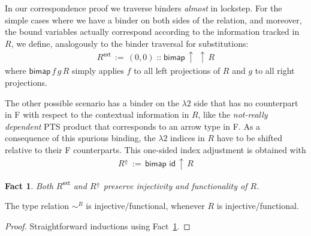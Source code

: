 \documentclass[a4paper,UKenglish]{lipics-v2016}
\newcommand{\ms}{\,}
\newcommand{\mrel}[1]{\mathrel{\ms #1 \ms}}
\newcommand{\eqdef}{\mrel{:=}}
\newcommand{\SysL}{$\lambda2$\xspace}
\newcommand{\tyr}{\mathrel{\sim}}
\newcommand{\Rext}[1]{\ensuremath{#1^{\mathsf{ext}}}}
\newcommand{\Rshift}[1]{\ensuremath{#1^{\Uparrow}}}
\newcommand{\id}{\mathsf{id}}
\newcommand{\shift}{\ensuremath{\uparrow}}
\theoremstyle{plain}
\newtheorem{fact}[theorem]{Fact}
\begin{document}
In our correspondence proof we traverse binders \emph{almost} in lockstep.
For the simple cases where we have a binder on both sides of the relation, and moreover, the bound variables actually correspond according to the information tracked in $R$, we define, analogously to the binder traversal for substitutions:
\begin{align*}
  \Rext{R} \eqdef (0,0) \mathop{::} \mathsf{bimap}\,\shift\,\,\shift\,R
\end{align*}
where $\mathsf{bimap}\,f\,g\,R$ simply applies $f$ to all left projections of $R$ and $g$ to all right projections.

The other possible scenario has a binder on the \SysL side that has no counterpart in F with respect to the contextual information in $R$, like the \emph{not-really dependent} PTS product that corresponds to an arrow type in F.
As a consequence of this spurious binding, the \SysL indices in $R$ have to be shifted relative to their F counterparts.
This one-sided index adjustment is obtained with
\begin{align*}
  \Rshift{R} \eqdef \mathsf{bimap}\,\,\id\,\shift\,R
\end{align*}

\begin{fact}
  \label{fac:rel-ext}
  Both $\Rext{R}$ and $\Rshift{R}$ preserve injectivity and functionality of $R$.\hfill\qedsymbol
\end{fact}

\begin{lemma}
  \label{lem:tyr-inj-fun}
  The type relation $\tyr^R$ is injective/functional, whenever $R$ is injective/functional.
\end{lemma}
\begin{proof}
  Straightforward inductions using Fact~\ref{fac:rel-ext}.
\end{proof}
\end{document}

